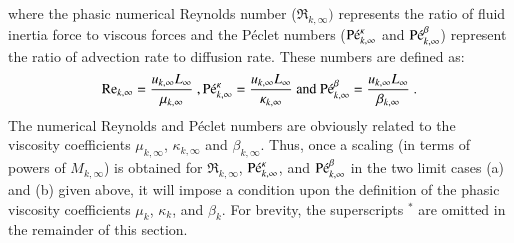 \documentclass[preprint,10pt]{elsarticle}
\begin{document}
%
where the phasic numerical Reynolds number ($\Re_{k,\infty})$ represents the ratio of fluid inertia force to viscous forces and 
the P\'eclet numbers ($\textrm{P\'e}_{k,\infty}^\kappa$ and $\textrm{P\'e}_{k,\infty}^\beta$) represent the ratio of advection rate to diffusion rate. These numbers are defined as:
%
\begin{equation}
\label{eq:ref_numb}
\Re_{k,\infty} = \frac{u_{k,\infty} L_\infty}{\mu_{k,\infty}} \ ,
\Pe_{k,\infty}^\kappa = \frac{u_{k,\infty} L_\infty}{\kappa_{k,\infty}} \text{ and }
\Pe_{k,\infty}^\beta = \frac{u_{k,\infty} L_\infty}{\beta_{k,\infty}} \ .
\end{equation}
%
The numerical Reynolds and P\'eclet numbers are obviously related to the 
viscosity coefficients $\mu_{k,\infty}$, $\kappa_{k,\infty}$ and $\beta_{k,\infty}$. Thus, once a scaling (in terms of powers of $M_{k,\infty}$) 
is obtained for $\Re_{k,\infty}$, $\textrm{P\'e}_{k,\infty}^\kappa$, and $\textrm{P\'e}_{k,\infty}^\beta$ in the two limit cases (a) and (b) given above, it will 
impose a condition upon the definition of the phasic viscosity coefficients $\mu_k$, $\kappa_k$, and $\beta_k$. 
For brevity, the superscripts $^*$ are omitted in the remainder of this section. 
%
\end{document}
